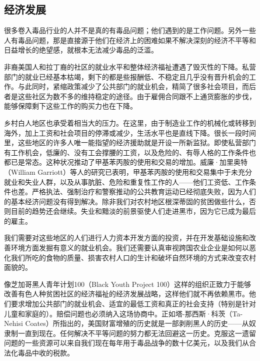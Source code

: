 \documentclass[fontset=fandol, a4paper, 12pt, openright]{ctexbook}
\begin{document}
\subsection{经济发展}
很多卷入毒品行业的人并不是真的有毒品问题；他们遇到的是工作问题。另外一些人有毒品问题，那是直接源于他们在经济上的困难如果不解决深刻的经济不平等和日益增长的绝望感，就根本无法减少毒品的泛滥。

非裔美国人和拉丁裔的社区的就业水平和整体经济福祉遭遇了毁灭性的下降。私营部门的就业已经基本枯竭，剩下的都是些报酬低、不稳定且几乎没有晋升机会的工作。与此同时，紧缩政策减少了公共部门的就业机会，精简了很多社会项目，而后者是这些社区为数不多的维持稳定的途径。由于雇佣合同跟不上通货膨胀的步伐，能够保障剩下这些工作的购买力也在下降。

乡村白人地区也承受着相当大的压力。在这里，由于制造业工作的机械化或转移到海外，加上工资和社会项目的停滞或减少，生活水平也是直线下降。很长一段时间里，这些地区的许多人唯一能指望的经济援助就是开设一所新监狱。即使私营部门有工作机会，低廉的、没有工会撑腰的工资，以及危险的、有辱人格的工作条件也都已是常态。这种状况推动了甲基苯丙胺的使用和交易的增加。威廉·加里奥特（William Garriott）等人的研究已表明，甲基苯丙胺的使用和交易集中于未充分就业和失业人群，以及从事肮脏、危险和重复性工作的人——他们工资低、工作条件也差。严格执法、强制治疗和警察推动的公共教育运动已经彻底失败，因为人们的基本经济问题没有得到解决。除非我们对农村地区根深蒂固的贫困做些什么，否则目前的趋势还会继续。失业和黯淡的前景驱使人们走进黑市，因为它已成为最后的雇主。

我们需要对这些地区的人们进行人力资本开发方面的投资，并在开发基础设施和改善环境方面发掘有意义的就业机会。我们还需要认真审视跨国农业企业是如何以恶化我们所吃的食物的质量、损害农村人口的生计和破坏自然环境的方式来改变农村面貌的。

像芝加哥黑人青年计划100（Black Youth Project 100）这样的组织正致力于能够改善有色人种贫困社区的经济福祉的经济发展战略，这样他们就不再依赖黑市。他们要求增加公共部门的就业机会、适宜的最低工资和真正的社会支持（特别是针对儿童和家庭的）。赔偿问题也必须纳入这场协商中。正如塔-那西斯·科茨（Ta-Nehisi Coates）所指出的，美国财富增殖的历史就是一部剥削黑人的历史——从奴隶制一直到现在。任何解决不平等问题的努力都无法回避这一历史。克服这一遗留问题的一些资源可以来自我们现在每年用于毒品战争的数十亿美元，以及我们从合法化毒品中收的税款。
\end{document}
